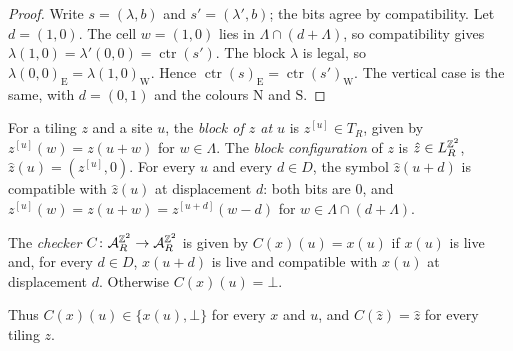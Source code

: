 \begin{proof}
Write $s=(\lambda,b)$ and $s'=(\lambda',b)$; the bits agree by compatibility. Let $d=(1,0)$. The cell $w=(1,0)$ lies in $\Lambda\cap(d+\Lambda)$, so compatibility gives $\lambda(1,0)=\lambda'(0,0)=\operatorname{ctr}(s')$. The block $\lambda$ is legal, so $\lambda(0,0)_{\mathrm E}=\lambda(1,0)_{\mathrm W}$. Hence $\operatorname{ctr}(s)_{\mathrm E}=\operatorname{ctr}(s')_{\mathrm W}$. The vertical case is the same, with $d=(0,1)$ and the colours $\mathrm N$ and $\mathrm S$.
\end{proof}

For a tiling $z$ and a site $u$, the \emph{block of $z$ at $u$} is $z^{[u]}\in T_R$, given by $z^{[u]}(w)=z(u+w)$ for $w\in\Lambda$. The \emph{block configuration} of $z$ is $\hat z\in L_R^{\mathbb{Z}^2}$, $\hat z(u)=(z^{[u]},0)$. For every $u$ and every $d\in D$, the symbol $\hat z(u+d)$ is compatible with $\hat z(u)$ at displacement $d$: both bits are $0$, and $z^{[u]}(w)=z(u+w)=z^{[u+d]}(w-d)$ for $w\in\Lambda\cap(d+\Lambda)$.

\begin{definition}\label{set:def-checker}
The \emph{checker} $C\colon\mathcal{A}_R^{\mathbb{Z}^2}\to\mathcal{A}_R^{\mathbb{Z}^2}$ is given by $C(x)(u)=x(u)$ if $x(u)$ is live and, for every $d\in D$, $x(u+d)$ is live and compatible with $x(u)$ at displacement $d$. Otherwise $C(x)(u)=\bot$.
\end{definition}

Thus $C(x)(u)\in\{x(u),\bot\}$ for every $x$ and $u$, and $C(\hat z)=\hat z$ for every tiling $z$.

